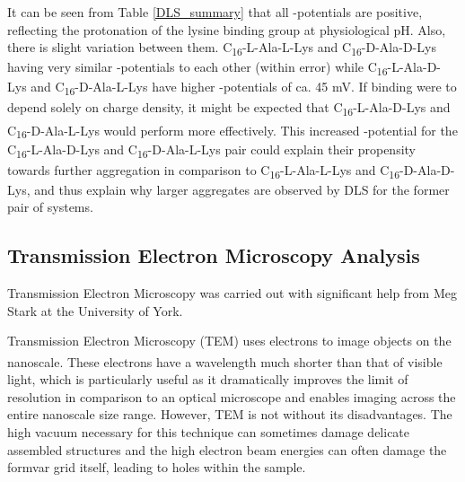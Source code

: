 It can be seen from Table \ref{DLS_summary} that all \textzeta-potentials are positive, reflecting the protonation of the lysine binding group at physiological pH. Also, there is slight variation between them. C\textsubscript{16}-L-Ala-L-Lys and C\textsubscript{16}-D-Ala-D-Lys having very similar \textzeta-potentials to each other (within error) while C\textsubscript{16}-L-Ala-D-Lys and C\textsubscript{16}-D-Ala-L-Lys have higher \textzeta-potentials of ca. 45 mV. If binding were to depend solely on charge density, it might be expected that C\textsubscript{16}-L-Ala-D-Lys and C\textsubscript{16}-D-Ala-L-Lys would perform more effectively.\textsuperscript{\cite{Chan2016ChiralBinding}} 
This increased \textzeta-potential for the C\textsubscript{16}-L-Ala-D-Lys and C\textsubscript{16}-D-Ala-L-Lys pair could explain their propensity towards further aggregation in comparison to C\textsubscript{16}-L-Ala-L-Lys and C\textsubscript{16}-D-Ala-D-Lys, and thus explain why larger aggregates are observed by DLS for the former pair of systems.

\subsection{Transmission Electron Microscopy Analysis}
Transmission Electron Microscopy was carried out with significant help from Meg Stark at the University of York.

Transmission Electron Microscopy (TEM) uses electrons to image objects on the nanoscale.\textsuperscript{\cite{Goodhew2001ElectronAnalysis}} These electrons have a wavelength much shorter than that of visible light, which is particularly useful as it dramatically improves the limit of resolution in comparison to an optical microscope and enables imaging across the entire nanoscale size range.  However, TEM is not without its disadvantages. The high vacuum necessary for this technique can sometimes damage delicate assembled structures and the high electron beam energies can often damage the formvar grid itself, leading to holes within the sample. 

